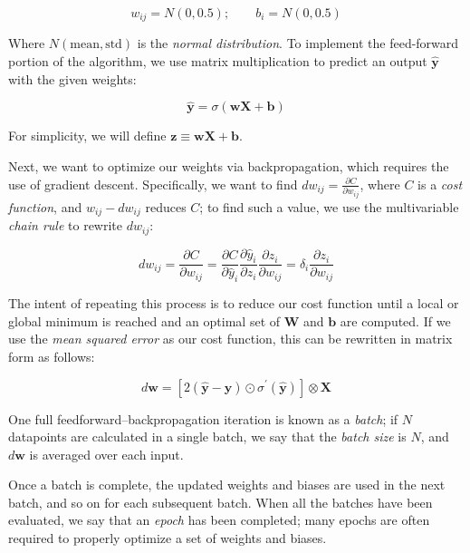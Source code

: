 \documentclass[a4paper,10pt,english]{article}
\begin{document}
\begin{multicols*}{2}
\begin{equation*}
w_{ij} = N(0, 0.5); \qquad b_i = N(0, 0.5)
\end{equation*}

Where $N(\text{mean}, \text{std})$ is the \textit{normal distribution}.  To implement the feed-forward portion of the algorithm, we use matrix multiplication to predict an output $\hat{\mathbf{y}}$ with the given weights:

\begin{equation*}
\hat{\mathbf{y}} = \sigma( \mathbf{w} \mathbf{X} + \mathbf{b} )
\end{equation*}

For simplicity, we will define $\mathbf{z} \equiv \mathbf{w} \mathbf{X} + \mathbf{b}$.

Next, we want to optimize our weights via backpropagation, which requires the use of gradient descent.  Specifically, we want to find $dw_{ij} = \frac{\partial C}{\partial w_{ij}}$, where $C$ is a \textit{cost function}, and $w_{ij} - dw_{ij}$ reduces $C$; to find such a value, we use the multivariable \textit{chain rule} to rewrite $dw_{ij}$:

\begin{equation*}
dw_{ij} = \frac{\partial C}{\partial w_{ij}} = \frac{\partial C}{\partial \hat{y}_i} \frac{\partial \hat{y}_i}{\partial z_i} \frac{\partial z_i}{\partial w_{ij}} = \delta_i \frac{\partial z_i}{\partial w_{ij}}
\end{equation*}

The intent of repeating this process is to reduce our cost function until a local or global minimum is reached and an optimal set of $\mathbf{W}$ and $\mathbf{b}$ are computed.  If we use the \textit{mean squared error} as our cost function, this can be rewritten in matrix form as follows:

\begin{equation}
\label{eq_backprop_output}
d\mathbf{w} = [2(\hat{\mathbf{y}} - \mathbf{y}) \odot \sigma^\prime(\hat{\mathbf{y}})] \otimes \mathbf{X}
\end{equation}

One full feedforward–backpropagation iteration is known as a \textit{batch}; if $N$ datapoints are calculated in a single batch, we say that the \textit{batch size} is $N$, and $d\mathbf{w}$ is averaged over each input.

Once a batch is complete, the updated weights and biases are used in the next batch, and so on for each subsequent batch. When all the batches have been evaluated, we say that an \textit{epoch} has been completed; many epochs are often required to properly optimize a set of weights and biases.


\end{multicols*}
\end{document}
